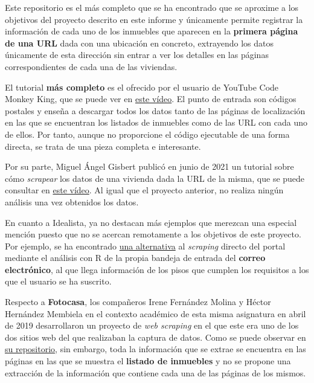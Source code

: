 \documentclass[12pt]{article}
\begin{document}
Este repositorio es el más completo que se ha encontrado que se aproxime a los objetivos del proyecto descrito en este informe y únicamente permite registrar la información de cada uno de los inmuebles que aparecen en la \textbf{primera página de una URL} dada con una ubicación en concreto, extrayendo los datos únicamente de esta dirección sin entrar a ver los detalles en las páginas correspondientes de cada una de las viviendas. 

El tutorial \textbf{más completo} es el ofrecido por el usuario de YouTube Code Monkey King, que se puede ver en \href{https://www.youtube.com/watch?v=4Tv73KuqgVo}{este vídeo}. El punto de entrada son códigos postales y enseña a descargar todos los datos tanto de las páginas de localización en las que se encuentran los listados de inmuebles como de las URL con cada uno de ellos. Por tanto, aunque no proporcione el código ejecutable de una forma directa, se trata de una pieza completa e interesante. 

Por su parte, Miguel Ángel Gisbert publicó en junio de 2021 un tutorial sobre cómo \textit{scrapear} los datos de una vivienda dada la URL de la misma, que se puede consultar en \href{https://www.youtube.com/watch?v=2UyJv5oe570}{este vídeo}. Al igual que el proyecto anterior, no realiza ningún análisis una vez obtenidos los datos. 

En cuanto a Idealista, ya no destacan más ejemplos que merezcan una especial mención puesto que no se acercan remotamente a los objetivos de este proyecto. Por ejemplo, se ha encontrado \href{https://medium.com/@rubenmarcos/crear-una-base-de-datos-de-la-evoluci%C3%B3n-del-mercado-inmobiliario-con-idealista-y-r-y-sin-scraping-1d5025a9d47e}{una alternativa} al \textit{scraping} directo del portal mediante el análisis con R de la propia bandeja de entrada del \textbf{correo electrónico}, al que llega información de los pisos que cumplen los requisitos a los que el usuario se ha suscrito.

Respecto a \textbf{Fotocasa}, los compañeros Irene Fernández Molina y Héctor Hernández Membiela en el contexto académico de esta misma asignatura en abril de 2019 desarrollaron un proyecto de \textit{web scraping} en el que este era uno de los dos sitios web del que realizaban la captura de datos. Como se puede observar en \href{https://github.com/EdelBlau/PEC_TPC}{su repositorio}, sin embargo, toda la información que se extrae se encuentra en las páginas en las que se muestra el \textbf{listado de inmuebles} y no se propone una extracción de la información que contiene cada una de las páginas de los mismos. 
\end{document}
